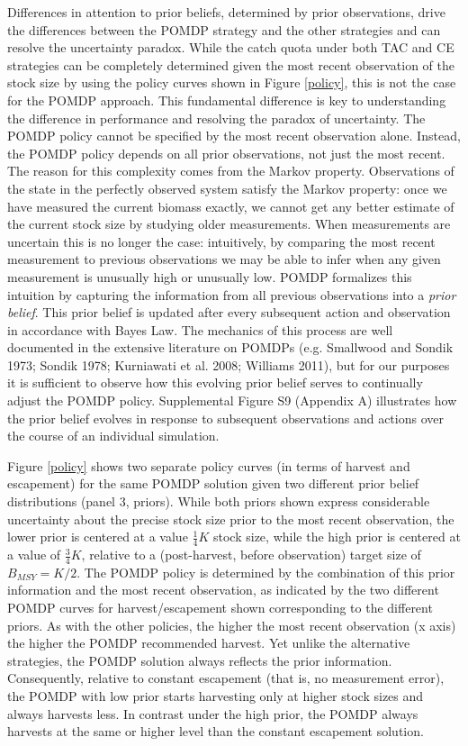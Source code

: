 \documentclass[3p]{elsarticle} %
\begin{document}
Differences in attention to prior beliefs, determined by prior
observations, drive the differences between the POMDP strategy and the
other strategies and can resolve the uncertainty paradox. While the
catch quota under both TAC and CE strategies can be completely
determined given the most recent observation of the stock size by using
the policy curves shown in Figure \ref{policy}, this is not the case for
the POMDP approach. This fundamental difference is key to understanding
the difference in performance and resolving the paradox of uncertainty.
The POMDP policy cannot be specified by the most recent observation
alone. Instead, the POMDP policy depends on all prior observations, not
just the most recent. The reason for this complexity comes from the
Markov property. Observations of the state in the perfectly observed
system satisfy the Markov property: once we have measured the current
biomass exactly, we cannot get any better estimate of the current stock
size by studying older measurements. When measurements are uncertain
this is no longer the case: intuitively, by comparing the most recent
measurement to previous observations we may be able to infer when any
given measurement is unusually high or unusually low. POMDP formalizes
this intuition by capturing the information from all previous
observations into a \emph{prior belief}. This prior belief is updated
after every subsequent action and observation in accordance with Bayes
Law. The mechanics of this process are well documented in the extensive
literature on POMDPs (e.g. Smallwood and Sondik 1973; Sondik 1978;
Kurniawati et al. 2008; Williams 2011), but for our purposes it is
sufficient to observe how this evolving prior belief serves to
continually adjust the POMDP policy. Supplemental Figure S9 (Appendix A)
illustrates how the prior belief evolves in response to subsequent
observations and actions over the course of an individual simulation.

Figure \ref{policy} shows two separate policy curves (in terms of
harvest and escapement) for the same POMDP solution given two different
prior belief distributions (panel 3, priors). While both priors shown
express considerable uncertainty about the precise stock size prior to
the most recent observation, the lower prior is centered at a value
\(\tfrac{1}{4}K\) stock size, while the high prior is centered at a
value of \(\tfrac{3}{4}K\), relative to a (post-harvest, before
observation) target size of \(B_{MSY} = K/2\). The POMDP policy is
determined by the combination of this prior information and the most
recent observation, as indicated by the two different POMDP curves for
harvest/escapement shown corresponding to the different priors. As with
the other policies, the higher the most recent observation (x axis) the
higher the POMDP recommended harvest. Yet unlike the alternative
strategies, the POMDP solution always reflects the prior information.
Consequently, relative to constant escapement (that is, no measurement
error), the POMDP with low prior starts harvesting only at higher stock
sizes and always harvests less. In contrast under the high prior, the
POMDP always harvests at the same or higher level than the constant
escapement solution.
\end{document}
